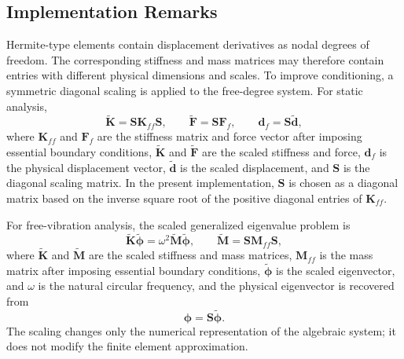 \documentclass[final,3p,times,fleqn]{elsarticle}
\begin{document}
\subsection{Implementation Remarks}
\label{subsec:fem_implementation_remarks}

Hermite-type elements contain displacement derivatives as nodal degrees
of freedom. The corresponding stiffness and mass matrices may therefore
contain entries with different physical dimensions and scales. To improve
conditioning, a symmetric diagonal scaling is applied to the free-degree
system. For static analysis,
\begin{equation}
\label{eq:diagonal_scaling}
\tilde{\mathbf{K}}
=
\mathbf{S}\mathbf{K}_{ff}\mathbf{S},
\qquad
\tilde{\mathbf{F}}
=
\mathbf{S}\mathbf{F}_{f},
\qquad
\mathbf{d}_{f}
=
\mathbf{S}\tilde{\mathbf{d}},
\end{equation}
where $\mathbf{K}_{ff}$ and $\mathbf{F}_{f}$ are the stiffness matrix and force vector after imposing essential boundary conditions, $\tilde{\mathbf{K}}$ and $\tilde{\mathbf{F}}$ are the scaled stiffness and force, $\mathbf{d}_{f}$ is the physical displacement vector, $\tilde{\mathbf{d}}$ is the scaled displacement, and $\mathbf{S}$ is the diagonal scaling matrix. In the present implementation, $\mathbf{S}$ is chosen as a diagonal matrix based on the inverse square root of the positive diagonal entries of $\mathbf{K}_{ff}$.

For free-vibration analysis, the scaled generalized eigenvalue problem is
\begin{equation}
\label{eq:scaled_eigenproblem}
\tilde{\mathbf{K}}\tilde{\boldsymbol{\phi}}
=
\omega^2
\tilde{\mathbf{M}}\tilde{\boldsymbol{\phi}},
\qquad
\tilde{\mathbf{M}}
=
\mathbf{S}\mathbf{M}_{ff}\mathbf{S},
\end{equation}
where $\tilde{\mathbf{K}}$ and $\tilde{\mathbf{M}}$ are the scaled stiffness and mass matrices, $\mathbf{M}_{ff}$ is the mass matrix after imposing essential boundary conditions, $\tilde{\boldsymbol{\phi}}$ is the scaled eigenvector, and $\omega$ is the natural circular frequency, and the physical eigenvector is recovered from
\begin{equation}
\label{eq:eigenvector_recovery}
\boldsymbol{\phi}
=
\mathbf{S}\tilde{\boldsymbol{\phi}}.
\end{equation}
The scaling changes only the numerical representation of the algebraic
system; it does not modify the finite element approximation.
\end{document}

